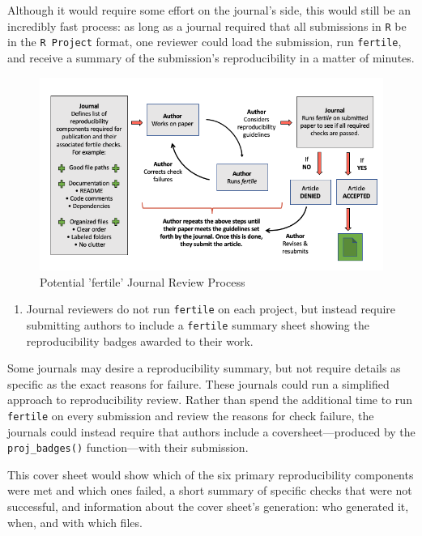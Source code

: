 \documentclass[12pt,twoside]{reedthesis}
\providecommand{\tightlist}{%
  \setlength{\itemsep}{0pt}\setlength{\parskip}{0pt}}
\begin{document}
Although it would require some effort on the journal's side, this would
still be an incredibly fast process: as long as a journal required that
all submissions in \texttt{R} be in the \texttt{R\ Project} format, one
reviewer could load the submission, run \texttt{fertile}, and receive a
summary of the submission's reproducibility in a matter of minutes.
\begin{figure}
\includegraphics[width=1\linewidth]{figure/journal-process} \caption{Potential 'fertile' Journal Review Process}\label{fig:unnamed-chunk-43}
\end{figure}
\begin{enumerate}
\def\labelenumi{\arabic{enumi}.}
\setcounter{enumi}{1}
\tightlist
\item
  Journal reviewers do not run \texttt{fertile} on each project, but
  instead require submitting authors to include a \texttt{fertile}
  summary sheet showing the reproducibility badges awarded to their
  work.
\end{enumerate}
Some journals may desire a reproducibility summary, but not require
details as specific as the exact reasons for failure. These journals
could run a simplified approach to reproducibility review. Rather than
spend the additional time to run \texttt{fertile} on every submission
and review the reasons for check failure, the journals could instead
require that authors include a coversheet---produced by the
\texttt{proj\_badges()} function---with their submission.

This cover sheet would show which of the six primary reproducibility
components were met and which ones failed, a short summary of specific
checks that were not successful, and information about the cover sheet's
generation: who generated it, when, and with which files.
\end{document}
